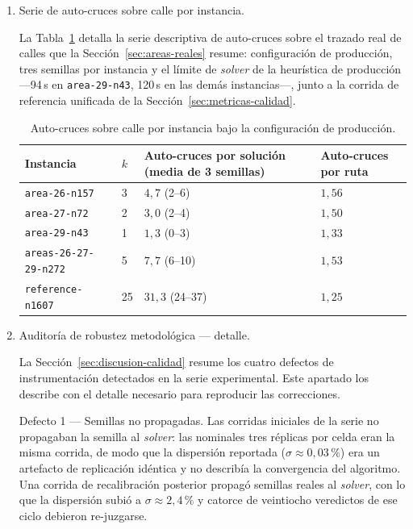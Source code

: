 \begin{enumerate}
\item Serie de auto-cruces sobre calle por instancia.
\label{anx:crossings-areas}

La Tabla~\ref{tab:areas-crossings} detalla la serie descriptiva de auto-cruces sobre el trazado
real de calles que la Sección~\ref{sec:areas-reales} resume: configuración de producción, tres
semillas por instancia y el límite de \textit{solver} de la heurística de producción ---94\,s en
\texttt{area-29-n43}, 120\,s en las demás instancias---, junto a la corrida de referencia unificada
de la Sección~\ref{sec:metricas-calidad}.

\begin{table}[H]
  \centering
  \caption{Auto-cruces sobre calle por instancia bajo la configuración de producción.}
  \label{tab:areas-crossings}
  \begin{tabularx}{\textwidth}{lXXX}
    \toprule
    Instancia &
      $k$ &
      Auto-cruces por solución (media de 3 semillas) &
      Auto-cruces por ruta \\
    \midrule
    \texttt{area-26-n157} &
      3 &
      $4{,}7$ (2--6) &
      $1{,}56$ \\
    \texttt{area-27-n72} &
      2 &
      $3{,}0$ (2--4) &
      $1{,}50$ \\
    \texttt{area-29-n43} &
      1 &
      $1{,}3$ (0--3) &
      $1{,}33$ \\
    \texttt{areas-26-27-29-n272} &
      5 &
      $7{,}7$ (6--10) &
      $1{,}53$ \\
    \texttt{reference-n1607} &
      25 &
      $31{,}3$ (24--37) &
      $1{,}25$ \\
    \bottomrule
  \end{tabularx}
\end{table}

\item Auditoría de robustez metodológica --- detalle.
\label{anx:auditoria-robustez}

La Sección~\ref{sec:discusion-calidad} resume los cuatro defectos de
instrumentación detectados en la serie experimental. Este apartado los describe
con el detalle necesario para reproducir las correcciones.

Defecto 1 --- Semillas no propagadas.
Las corridas iniciales de la serie no propagaban la semilla al \textit{solver}: las
nominales tres réplicas por celda eran la misma corrida, de modo que la dispersión
reportada ($\sigma \approx 0{,}03\,\%$) era un artefacto de replicación idéntica y no
describía la convergencia del algoritmo. Una corrida de recalibración posterior propagó
semillas reales al \textit{solver}, con lo que la dispersión subió a $\sigma \approx
2{,}4\,\%$ y catorce de veintiocho veredictos de ese ciclo debieron re-juzgarse.


\end{enumerate}
